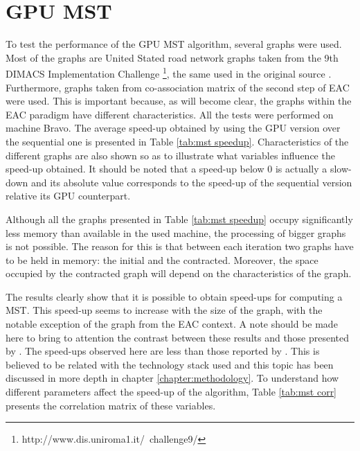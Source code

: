 \section{GPU MST}
\label{sec:gpu mst}


To test the performance of the GPU MST algorithm, several graphs were used.
Most of the graphs are United Stated road network graphs taken from the 9th DIMACS Implementation Challenge \footnote{http://www.dis.uniroma1.it/~challenge9/}, the same used in the original source \cite{Sousa2015}.
Furthermore, graphs taken from co-association matrix of the second step of EAC were used.
This is important because, as will become clear, the graphs within the EAC paradigm have different characteristics.
All the tests were performed on machine Bravo.
The average speed-up obtained by using the GPU version over the sequential one is presented in Table \ref{tab:mst speedup}.
Characteristics of the different graphs are also shown so as to illustrate what variables influence the speed-up obtained.
It should be noted that a speed-up below 0 is actually a slow-down and its absolute value corresponds to the speed-up of the sequential version relative its GPU counterpart.



Although all the graphs presented in Table \ref{tab:mst speedup} occupy significantly less memory than available in the used machine, the processing of bigger graphs is not possible.
The reason for this is that between each iteration two graphs have to be held in memory: the initial and the contracted.
Moreover, the space occupied by the contracted graph will depend on the characteristics of the graph.

The results clearly show that it is possible to obtain speed-ups for computing a MST.
This speed-up seems to increase with the size of the graph, with the notable exception of the graph from the EAC context.
A note should be made here to bring to attention the contrast between these results and those presented by \citet{Sousa2015}.
The speed-ups observed here are less than those reported by \citet{Sousa2015}.
This is believed to be related with the technology stack used and this topic has been discussed in more depth in chapter \ref{chapter:methodology}.
To understand how different parameters affect the speed-up of the algorithm, Table \ref{tab:mst corr} presents the correlation matrix of these variables.

